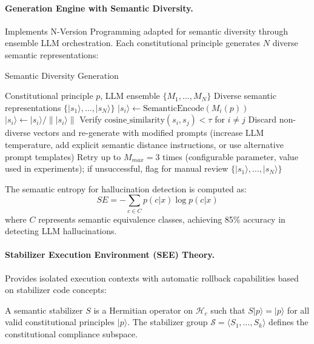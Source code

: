 \documentclass[manuscript,screen,9pt]{acmart}
\begin{document}
\paragraph{Generation Engine with Semantic Diversity.} Implements N-Version Programming adapted for semantic diversity through ensemble LLM orchestration. Each constitutional principle generates $N$ diverse semantic representations:

\begin{algorithm}[H]
	\caption{Semantic Diversity Generation}
	\label{alg:semantic_diversity}
	\begin{algorithmic}[1]
		\Require Constitutional principle $p$, LLM ensemble $\{M_1, \ldots, M_N\}$
		\Ensure Diverse semantic representations $\{|s_1\rangle, \ldots, |s_N\rangle\}$
		\State $|s_i\rangle \leftarrow \text{SemanticEncode}(M_i(p))$
		\State $|s_i\rangle \leftarrow |s_i\rangle / \||s_i\rangle\|$ 
		\EndFor
		\State Verify $\text{cosine\_similarity}(s_i, s_j) < \tau$ for $i \neq j$ 
		\State Discard non-diverse vectors and re-generate with modified prompts (increase LLM temperature, add explicit semantic distance instructions, or use alternative prompt templates)
		\State Retry up to $M_{max} = 3$ times (configurable parameter, value used in experiments); if unsuccessful, flag for manual review
		\EndIf
		\State \Return $\{|s_1\rangle, \ldots, |s_N\rangle\}$
	\end{algorithmic}
\end{algorithm}

The semantic entropy for hallucination detection is computed as:
$$SE = -\sum_{c \in C} p(c|x) \log p(c|x)$$
where $C$ represents semantic equivalence classes, achieving 85\% accuracy in detecting LLM hallucinations.

\paragraph{Stabilizer Execution Environment (SEE) Theory.} Provides isolated execution contexts with automatic rollback capabilities based on stabilizer code concepts:

\begin{definition}
	A semantic stabilizer $S$ is a Hermitian operator on $\mathcal{H}_c$ such that $S|p\rangle = |p\rangle$ for all valid constitutional principles $|p\rangle$. The stabilizer group $\mathcal{S} = \langle S_1, \ldots, S_k \rangle$ defines the constitutional compliance subspace.
\end{definition}
\end{document}
